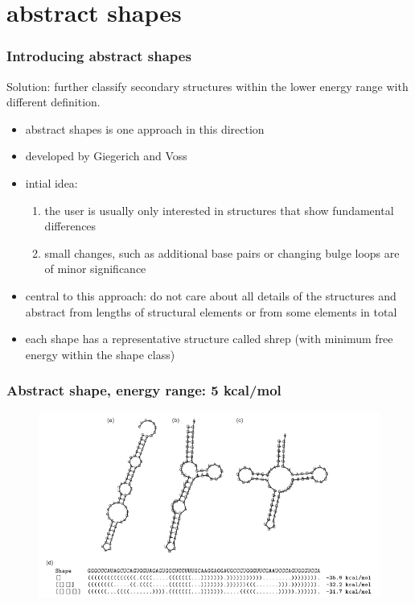 \documentclass[ignorenonframetext,10pt]{beamer}
\begin{document}
\section{abstract shapes}
\begin{frame}
\frametitle{Introducing abstract shapes}
    Solution: further classify secondary structures within the lower energy range with different definition.
    \begin{itemize} 
    \item abstract shapes is one approach in this direction
    \item developed by Giegerich and Voss
    \item intial idea:
    \begin{enumerate}
      \item the user is usually only interested in structures that show fundamental differences
      \item small changes, such as additional base pairs or changing bulge loops are of minor significance
    \end{enumerate}
    \item central to this approach: do not care about all details of the structures and abstract from lengths of structural elements or from some elements in total 
    \item each shape has a representative structure called shrep (with minimum free energy within the shape class)
    \end{itemize}
\end{frame}


\begin{frame}
\frametitle{Abstract shape, energy range: 5 kcal/mol}  
\begin{figure}
  \includegraphics[scale=0.6]{images/shapes_example.jpg} 
\end{figure}
\end{frame}
\end{document}
